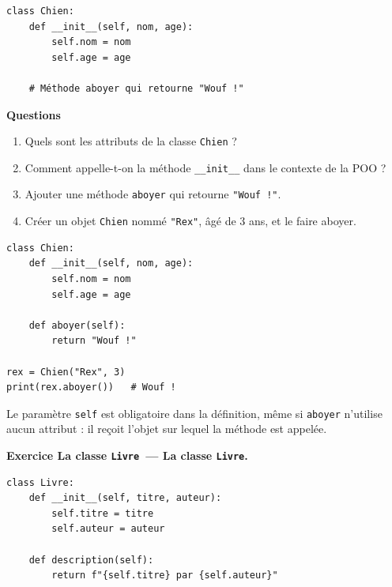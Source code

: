 \documentclass[11pt,a4paper]{article}
\newif\ifcorrige
\newcommand{\py}[1]{\texttt{#1}}
\newcounter{exo}[section]
\renewcommand{\theexo}{\arabic{exo}}
\newcommand{\exo}[2][]{%
  \Needspace{5cm}\stepcounter{exo}%
  \begin{quest}\textbf{Exercice \theexo\ifx\relax#1\relax\else\ — #1\fi.}
  \ifx\relax#2\relax\else\ #2\fi\end{quest}}
\newcommand{\rep}[1]{%
  \ifcorrige
    \par\smallskip{\color{corr}\small#1}\par\smallskip
  \else
    \par\nobreak\vspace{1mm}\noindent\color{black!55}\dotfill\par
    \noindent\color{black!55}\dotfill\par\color{black}\vspace{1mm}
  \fi}
\newcommand{\zonecode}[1][4cm]{%
  \ifcorrige\else
    \par\smallskip\noindent
    \begin{tcolorbox}[colback=white,colframe=black!45,boxrule=0.5pt,arc=1pt,height=#1]\end{tcolorbox}%
  \fi}
\newenvironment{solution}
  {\ifcorrige
     \begin{tcolorbox}[enhanced,breakable,colback=corrbg,colframe=corr,boxrule=0.6pt,arc=1pt,
       left=5pt,right=5pt,top=4pt,bottom=4pt,
       title={Corrigé},coltitle=corr,fonttitle=\bfseries\small,detach title,
       before upper={\tcbtitle\par\smallskip},fontupper=\small]%
   \else
     \setbox0\vbox\bgroup
   \fi}
  {\ifcorrige\end{tcolorbox}\else\egroup\fi}
\begin{document}
\begin{lstlisting}
class Chien:
    def __init__(self, nom, age):
        self.nom = nom
        self.age = age

    # Méthode aboyer qui retourne "Wouf !"
\end{lstlisting}

\textbf{Questions}
\begin{enumerate}
  \item Quels sont les attributs de la classe \py{Chien} ?
    \rep{\py{nom} et \py{age}, deux attributs d'instance.}
  \item Comment appelle-t-on la méthode \py{__init__} dans le contexte de la POO ?
    \rep{Le \textbf{constructeur} (ou initialiseur). C'est une \emph{méthode spéciale}, reconnaissable
    à son double souligné ; on ne l'appelle jamais directement, elle est déclenchée par
    \py{Chien("Rex", 3)}.}
  \item Ajouter une méthode \py{aboyer} qui retourne \py{"Wouf !"}.
  \item Créer un objet \py{Chien} nommé \py{"Rex"}, âgé de 3 ans, et le faire aboyer.
\end{enumerate}
\zonecode[4.5cm]
\begin{solution}
\begin{lstlisting}
class Chien:
    def __init__(self, nom, age):
        self.nom = nom
        self.age = age

    def aboyer(self):
        return "Wouf !"

rex = Chien("Rex", 3)
print(rex.aboyer())   # Wouf !
\end{lstlisting}
Le paramètre \py{self} est obligatoire dans la définition, même si \py{aboyer} n'utilise aucun
attribut : il reçoit l'objet sur lequel la méthode est appelée.
\end{solution}

\exo[La classe \py{Livre}]{}

\begin{lstlisting}
class Livre:
    def __init__(self, titre, auteur):
        self.titre = titre
        self.auteur = auteur

    def description(self):
        return f"{self.titre} par {self.auteur}"
\end{lstlisting}
\end{document}
